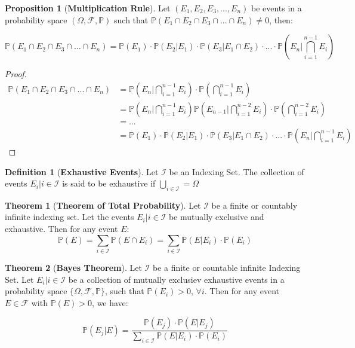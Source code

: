 \documentclass[11pt]{article}
\theoremstyle{definition}
\newtheorem{defn}{Definition}
\newtheorem{theorem}{Theorem}[section]
\newtheorem{prop}{Proposition}[section]
\begin{document}
\begin{prop}[\textbf{Multiplication Rule}]
Let $(E_1,E_2,E_3,...,E_n)$ be events in a probability space $(\Omega, \mathcal{F}, \mathbb{P})$ such that $\mathbb{P}(E_1 \cap E_2 \cap E_3 \cap ... \cap E_n) \neq 0$, then:

\begin{equation}
\mathbb{P}(E_1 \cap E_2 \cap E_3 \cap ... \cap E_n) = \mathbb{P}(E_1) \cdotp \mathbb{P}(E_2 | E_1) \cdotp \mathbb{P}(E_3 | E_1 \cap E_2) \cdotp ...  \cdotp \mathbb{P}(E_n | \bigcap_{i = 1}^{n-1} E_i)
\end{equation}

\end{prop}

\begin{proof}
\begin{align*}
\mathbb{P}(E_1 \cap E_2 \cap E_3 \cap ... \cap E_n) & = \mathbb{P}(E_n | \bigcap_{i = 1}^{n-1} E_i) \cdotp \mathbb{P}(\bigcap_{i = 1}^{n-1} E_i) \\
& = \mathbb{P}(E_n | \bigcap_{i = 1}^{n-1} E_i) \mathbb{P}(E_{n-1} | \bigcap_{i = 1}^{n-2} E_i) \cdotp \mathbb{P}(\bigcap_{i = 1}^{n-2} E_i) \\
& = ... \\
& = \mathbb{P}(E_1) \cdotp \mathbb{P}(E_2 | E_1) \cdotp \mathbb{P}(E_3 | E_1 \cap E_2) \cdotp ...  \cdotp \mathbb{P}(E_n | \bigcap_{i = 1}^{n-1} E_i)
\end{align*}
\end{proof}

\begin{defn}[\textbf{Exhaustive Events}]
Let $\mathcal{I}$ be an Indexing Set. The collection of events {$E_i | i \in \mathcal{I}$} is said to be exhaustive if $\bigcup_{i \in \mathcal{I}} = \Omega$
\end{defn}

\begin{theorem}[\textbf{Theorem of Total Probability}]
Let $\mathcal{I}$ be a finite or countably infinite indexing set. Let the events {$E_i | i \in \mathcal{I}$} be mutually exclusive and exhaustive. Then for any event $E$:
$$
\mathbb{P}(E) = \sum_{i \in \mathcal{I}} \mathbb{P}(E \cap E_i) = \sum_{i \in \mathcal{I}} \mathbb{P}(E | E_i) \cdotp \mathbb{P}(E_i) 
$$
\end{theorem}

\begin{theorem}[\textbf{Bayes Theorem}]
Let $\mathcal{I}$ be a finite or countable infinite Indexing Set. Let {$E_i | i \in \mathcal{I}$} be a collection of mutually exclusiev exhaustive events in a probability space $\{\Omega, \mathcal{F}, \mathbb{P}\}$, such that $\mathbb{P}(E_i) > 0$, $\forall i$. Then for any event $E \in \mathcal{F}$ with $\mathbb{P}(E)>0$, we have:

$$
\mathbb{P}(E_j | E) = \frac{\mathbb{P}(E_j)\cdotp\mathbb{P}(E|E_j)}{\sum_{i \in \mathcal{I}} \mathbb{P}(E | E_i) \cdotp \mathbb{P}(E_i) }
$$
\end{theorem}
\end{document}
